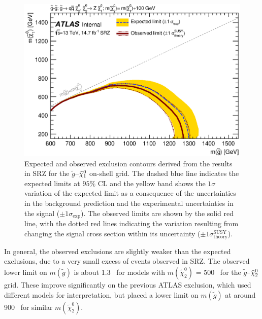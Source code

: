 \begin{figure}[!htb]
\centering
\includegraphics[width=.8\textwidth]{figures/interpretation/excl_SM_GG_N2.eps}
\caption{
Expected and observed exclusion contours derived from the results in SRZ for the $\tilde{g}$--$\tilde{\chi}_1^0$ on-shell grid. 
The dashed blue line indicates the expected limits at $95\%$ CL and the yellow band shows the $1\sigma$ variation of the expected limit as a consequence of the uncertainties in the background prediction and the experimental uncertainties in the signal ($\pm1\sigma_\text{exp}$). 
The observed limits are shown by the solid red line, with the dotted red lines indicating the variation resulting from changing the signal cross section within its uncertainty ($\pm1\sigma^\text{SUSY}_\text{theory}$).
\label{fig:excl_SMGGN2}
}
\end{figure}

In general, the observed exclusions are slightly weaker than the expected exclusions, due to a very small excess of events observed in SRZ. The observed lower limit on $m(\tilde{g})$ is about 1.3 \tev~for models with $m(\tilde{\chi}^{0}_{2})$ = 500 \gev~for the $\tilde{g}$--$\tilde{\chi}_2^0$ grid. These improve significantly on the previous \ac{ATLAS} exclusion, which used different models for interpretation, but placed a lower limit on $m(\tilde{g})$ at around 900 \gev~for similar $m(\tilde{\chi}^{0}_{2})$. 



